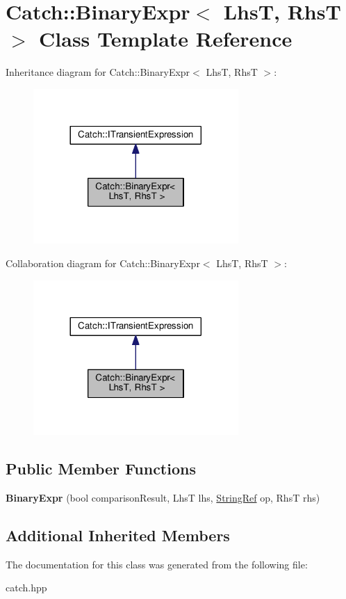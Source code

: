 \hypertarget{classCatch_1_1BinaryExpr}{}\section{Catch\+:\+:Binary\+Expr$<$ LhsT, RhsT $>$ Class Template Reference}
\label{classCatch_1_1BinaryExpr}


Inheritance diagram for Catch\+:\+:Binary\+Expr$<$ LhsT, RhsT $>$\+:\nopagebreak
\begin{figure}[H]
\begin{center}
\leavevmode
\includegraphics[width=221pt]{classCatch_1_1BinaryExpr__inherit__graph}
\end{center}
\end{figure}


Collaboration diagram for Catch\+:\+:Binary\+Expr$<$ LhsT, RhsT $>$\+:\nopagebreak
\begin{figure}[H]
\begin{center}
\leavevmode
\includegraphics[width=221pt]{classCatch_1_1BinaryExpr__coll__graph}
\end{center}
\end{figure}
\subsection*{Public Member Functions}
\begin{DoxyCompactItemize}
\item 
{\bfseries Binary\+Expr} (bool comparison\+Result, LhsT lhs, \hyperlink{classCatch_1_1StringRef}{String\+Ref} op, RhsT rhs)\hypertarget{classCatch_1_1BinaryExpr_a657d66346aef97a760c22776fe6008b6}{}\label{classCatch_1_1BinaryExpr_a657d66346aef97a760c22776fe6008b6}

\end{DoxyCompactItemize}
\subsection*{Additional Inherited Members}


The documentation for this class was generated from the following file\+:\begin{DoxyCompactItemize}
\item 
catch.\+hpp\end{DoxyCompactItemize}
